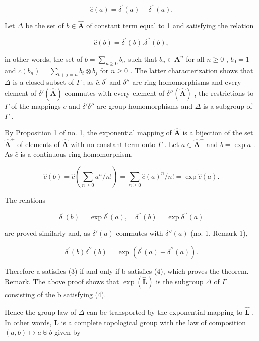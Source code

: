 \[
\hat {c} (a) = \delta^ {\prime} (a) + \delta^ {\prime \prime} (a).\tag{3}
\]

Let \(\Delta\) be the set of \(b\in \hat{\mathbf{A}}\) of constant term equal to 1 and satisfying the relation

\[
\hat {c} (b) = \delta^ {\prime} (b). \delta^ {\prime \prime} (b),\tag{4}
\]

in other words, the set of \(b = \sum_{n\geqslant 0}b_n\) such that \(b_{n}\in \mathbf{A}^{n}\) for all \(n\geqslant 0\) , \(b_0 = 1\) and \(c(b_{n}) = \sum_{t + j = n}b_{t}\otimes b_{j}\) for \(n\geqslant 0\) . The latter characterization shows that \(\Delta\) is a closed subset of \(\Gamma\) ; as \(\hat c,\delta^{\prime}\) and \(\delta ''\) are ring homomorphisms and every element of \(\delta'(\hat{\mathbf A})\) commutes with every element of \(\delta''(\hat{\mathbf A})\) , the restrictions to \(\Gamma\) of the mappings \(c\) and \(\delta ' \delta''\) are group homomorphisms and \(\Delta\) is a subgroup of \(\Gamma\) .

By Proposition 1 of no. 1, the exponential mapping of \(\hat{\mathbf{A}}\) is a bijection of the set \(\hat{\mathbf{A}}^{+}\) of elements of \(\hat{\mathbf{A}}\) with no constant term onto \(\Gamma\) . Let \(a \in \hat{\mathbf{A}}^{+}\) and \(b = \exp a\) . As \(\hat c\) is a continuous ring homomorphism,

\[
\hat {c} (b) = \hat {c} \left(\sum_ {n \geqslant 0} a ^ {n} / n!\right) = \sum_ {n \geqslant 0} \hat {c} (a) ^ {n} / n! = \exp \hat {c} (a).
\]

The relations

\[
\delta^ {\prime} (b) = \exp \delta^ {\prime} (a), \quad \delta^ {\prime \prime} (b) = \exp \delta^ {\prime \prime} (a)
\]

are proved similarly and, as \(\delta'(a)\) commutes with \(\delta''(a)\) (no. 1, Remark 1),

\[
\delta^ {\prime} (b) \delta^ {\prime \prime} (b) = \exp (\delta^ {\prime} (a) + \delta^ {\prime \prime} (a)).
\]

Therefore a satisfies (3) if and only if b satisfies (4), which proves the theorem. Remark. The above proof shows that \(\exp(\hat{\mathbf{L}})\) is the subgroup \(\Delta\) of \(\Gamma\) consisting of the b satisfying (4).

Hence the group law of \(\Delta\) can be transported by the exponential mapping to \(\hat{\mathbf{L}}\) . In other words, \(\hat{\mathbf{L}}\) is a complete topological group with the law of composition \((a, b) \mapsto a \uplus b\) given by


